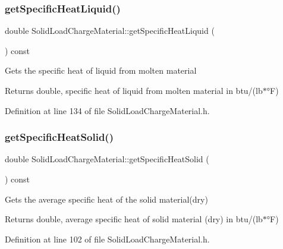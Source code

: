 \subsubsection{\texorpdfstring{get\+Specific\+Heat\+Liquid()}{getSpecificHeatLiquid()}\hspace{0.1cm}{\footnotesize\ttfamily [3/3]}}
{\footnotesize\ttfamily double Solid\+Load\+Charge\+Material\+::get\+Specific\+Heat\+Liquid (\begin{DoxyParamCaption}{ }\end{DoxyParamCaption}) const\hspace{0.3cm}{\ttfamily [inline]}}

Gets the specific heat of liquid from molten material \begin{DoxyReturn}{Returns}
double, specific heat of liquid from molten material in btu/(lb$\ast$°F) 
\end{DoxyReturn}


Definition at line 134 of file Solid\+Load\+Charge\+Material.\+h.

\mbox{\label{class_solid_load_charge_material_af84f1f7dd167f67c0c02206339bbfe27}} 
\subsubsection{\texorpdfstring{get\+Specific\+Heat\+Solid()}{getSpecificHeatSolid()}\hspace{0.1cm}{\footnotesize\ttfamily [1/3]}}
{\footnotesize\ttfamily double Solid\+Load\+Charge\+Material\+::get\+Specific\+Heat\+Solid (\begin{DoxyParamCaption}{ }\end{DoxyParamCaption}) const\hspace{0.3cm}{\ttfamily [inline]}}

Gets the average specific heat of the solid material(dry) \begin{DoxyReturn}{Returns}
double, average specific heat of solid material (dry) in btu/(lb$\ast$°F) 
\end{DoxyReturn}


Definition at line 102 of file Solid\+Load\+Charge\+Material.\+h.

\mbox{\label{class_solid_load_charge_material_af84f1f7dd167f67c0c02206339bbfe27}} 
